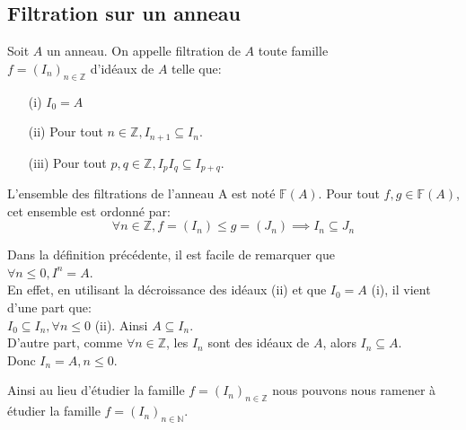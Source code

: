\subsection{Filtration sur un anneau}
\begin{madefinition}
	Soit $A$ un anneau. On appelle filtration de $A$ toute famille\\ $f = (I_n)_{n \in \mathbb{Z}}$ d'idéaux de $A$ telle que:\\
	\begin{enumerate}
		\item[(i)] $I_0 = A$ \\
		\item[(ii)] Pour tout $n \in \mathbb{Z}, I_{n+1} \subseteq I_n$.\\
		\item[(iii)] Pour tout $p,q \in \mathbb{Z}, I_pI_q \subseteq I_{p+q}$.\\
	\end{enumerate}
	L'ensemble des filtrations de l'anneau A est noté $\mathbb{F}(A)$. Pour tout $f,g \in \mathbb{F}(A)$, cet ensemble est ordonné par:
	\[\forall n \in \mathbb{Z}, f = (I_n) \leqslant g = (J_n) \implies  I_n \subseteq J_n \]
\end{madefinition}

\begin{maremarque}
	Dans la définition précédente, il est facile de remarquer que\\ $\forall n \leq 0, I^n = A$.\\ En effet, en utilisant la décroissance des idéaux (ii) et que $I_0 = A$ (i), il vient d'une part que:\\ $I_0 \subseteq I_n , \forall n \leq 0$ (ii). Ainsi $A \subseteq I_n$.\\
	D'autre part, comme $\forall n \in \mathbb{Z}$, les $I_n$ sont des idéaux de $A$, alors $I_n \subseteq A$.\\
	Donc $I_n = A, n \leq 0$.
\end{maremarque}
Ainsi au lieu d'étudier la famille $f = (I_n)_{n \in \mathbb{Z}}$ nous pouvons nous ramener à étudier la famille $f = (I_n)_{n \in \mathbb{N}}$.

